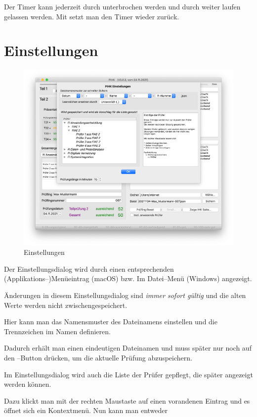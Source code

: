 \documentclass[a4paper,notitlepage,parskip=half]{scrartcl}
\begin{document}
Der Timer kann jederzeit durch  unterbrochen werden und durch  weiter laufen gelassen werden. Mit  setzt man den Timer wieder zurück.

\section{Einstellungen}

\begin{figure}[ht]
  \centering
  \includegraphics[width=\textwidth]{Einstellungen.png}
  \caption{Einstellungen}
  \label{fig:einstellungen}
\end{figure}

Der Einstellungsdialog wird durch einen entsprechenden (Applikations--)Menüeintrag (macOS) bzw. Im Datei--Menü (Windows) angezeigt.

Änderungen in diesem Einstellungsdialog sind \emph{immer sofort gültig} und die alten Werte werden nicht zwischengespeichert.

Hier kann man das Namensmuster des Dateinamens einstellen und die Trennzeichen im Namen definieren.

Dadurch erhält man einen eindeutigen Dateinamen und muss später nur noch auf den --Button drücken, um die aktuelle Prüfung abzuspeichern.

Im Einstellungsdialog wird auch die Liste der Prüfer gepflegt, die später angezeigt werden können.

Dazu klickt man mit der rechten Maustaste auf einen vorandenen Eintrag und es öffnet sich ein Kontextmenü.
Nun kann man entweder
\end{document}
